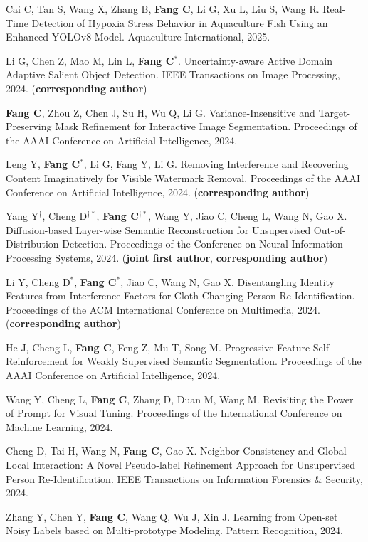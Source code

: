 \documentclass[a4paper,36pt]{article}
\newcommand{\tb}[1]{\textbf{#1}}
\newcommand{\resumeItemWithoutTitle}[1]{
  \item\justifying\small{
    {#1 \vspace{-2pt}}
  }
}
\begin{document}
\resumeItemWithoutTitle{Cai C, Tan S, Wang X, Zhang B, \tb{Fang C}, Li G, Xu L, Liu S, Wang R. Real-Time Detection of Hypoxia Stress Behavior in Aquaculture Fish Using an Enhanced YOLOv8 Model. Aquaculture International, 2025.}

\resumeItemWithoutTitle{Li G, Chen Z, Mao M, Lin L, \tb{Fang C}$^\ast$. Uncertainty-aware Active Domain Adaptive Salient Object Detection. IEEE Transactions on Image Processing, 2024. (\tb{corresponding author})}

\resumeItemWithoutTitle{\tb{Fang C}, Zhou Z, Chen J, Su H, Wu Q, Li G. Variance-Insensitive and Target-Preserving Mask Refinement for Interactive Image Segmentation. Proceedings of the AAAI Conference on Artificial Intelligence, 2024. }
\resumeItemWithoutTitle{Leng Y, \tb{Fang C}$^{\ast}$, Li G, Fang Y, Li G. Removing Interference and Recovering Content Imaginatively for Visible Watermark Removal. Proceedings of the AAAI Conference on Artificial Intelligence, 2024. (\tb{corresponding author})}
\resumeItemWithoutTitle{Yang Y$^{\dag}$, Cheng D$^{\dag\ast}$, \tb{Fang C}$^{\dag\ast}$, Wang Y, Jiao C, Cheng L, Wang N, Gao X. Diffusion-based Layer-wise Semantic Reconstruction for Unsupervised Out-of-Distribution Detection. Proceedings of the Conference on Neural Information Processing Systems, 2024. (\tb{joint first author}, \tb{corresponding author})}
\resumeItemWithoutTitle{Li Y, Cheng D$^{\ast}$, \tb{Fang C}$^{\ast}$, Jiao C, Wang N, Gao X. Disentangling Identity Features from Interference Factors for Cloth-Changing Person Re-Identification. Proceedings of the ACM International Conference on Multimedia, 2024. (\tb{corresponding author})}
\resumeItemWithoutTitle{He J, Cheng L, \tb{Fang C}, Feng Z, Mu T, Song M. Progressive Feature Self-Reinforcement for Weakly Supervised Semantic Segmentation. Proceedings of the AAAI Conference on Artificial Intelligence, 2024. }

\resumeItemWithoutTitle{Wang Y, Cheng L, \tb{Fang C}, Zhang D, Duan M, Wang M. Revisiting the Power of Prompt for Visual Tuning. Proceedings of the International Conference on Machine Learning, 2024. }

\resumeItemWithoutTitle{Cheng D, Tai H, Wang N, \tb{Fang C}, Gao X. Neighbor Consistency and Global-Local Interaction: A Novel Pseudo-label Refinement Approach for Unsupervised Person Re-Identification. IEEE Transactions on Information Forensics \& Security, 2024.}

\resumeItemWithoutTitle{Zhang Y, Chen Y, \tb{Fang C}, Wang Q, Wu J, Xin J. Learning from Open-set Noisy Labels based on Multi-prototype Modeling. Pattern Recognition, 2024.}
\end{document}
